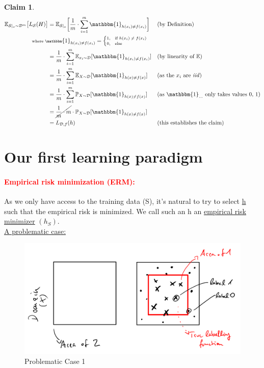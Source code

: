 \documentclass[10pt,a4paper]{article}
\newtheorem*{claim}{Claim}
\theoremstyle{remark}
\theoremstyle{definition}
\theoremstyle{plain}
\begin{document}
\begin{claim}
\begin{align*}
	 \mathbb{E}_{\mathcal{S}|_x \sim \mathcal{D}^m}\big[L_\mathcal{S}(H)\big] &= \mathbb{E}_{\mathcal{S}|_x}\bigg[\frac{1}{m} \cdot \sum_{i=1}^{m} \mathbbm{1}_{h(x_i) \neq f(x_i)}\bigg]  &&  \text{(by Definition)}\\
	 & \hspace{-1cm}\scriptsize{\text{where } \mathbbm{1}_{h(x_i) \neq f(x_i)} = \begin{cases} 1 , &  \text{if $h(x_i) \neq f(x_i)$} \\ 0 , & \text{else} \end{cases}}\\
	 &= \frac{1}{m} \cdot \sum_{i=1}^{m} \mathbb{E}_{x_i \sim \mathcal{D}}[\mathbbm{1}_{h(x_i) \neq f(x_i)}] && \text{(by linearity of $\mathbb{E}$)}\\
	 &= \frac{1}{m} \cdot \sum_{i=1}^{m} \mathbb{E}_{X \sim \mathcal{D}}[\mathbbm{1}_{h(x) \neq f(x)}] && \text{(as the $x_i$ are \textit{iid})}\\
	 &= \frac{1}{m} \cdot \sum_{i=1}^{m} \mathbb{P}_{X\sim \mathcal{D}}[\mathbbm{1}_{h(x) \neq f(x)}] && \text{(as $\mathbbm{1}_{...}$ only takes values 0, 1)}\\
	 &=  \cancel{\frac{1}{m} \cdot m} \cdot \mathbb{P}_{X\sim \mathcal{D}}[\mathbbm{1}_{h(x) \neq f(x)}]\\
	 &= L_{\mathcal{D},f}(h) && \text{(this establishes the claim)}
\end{align*}
\end{claim}

\section{Our first learning paradigm} 
\paragraph{\textcolor{red}{Empirical risk minimization (ERM):}} As we only have access to the training data (S), it's natural to try to select \underline{h} such that the empirical risk is minimized. We call such an h an \underline{empirical risk minimizer} $(h_S)$.\\

\underline{A problematic case:}
\begin{figure}[H]
	\centering
	\includegraphics[width=0.7\linewidth]{sketch_1}
	\caption{Problematic Case 1}
	\label{fig:sketch1}
\end{figure}
\end{document}
